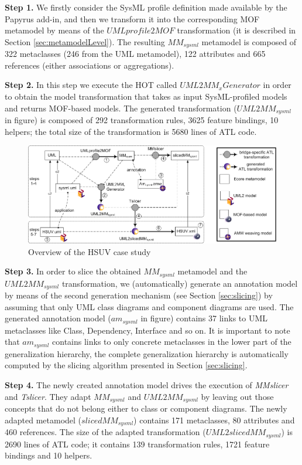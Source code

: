 \textbf{Step 1.} We firstly consider the SysML profile definition made available by the Papyrus add-in,
and then we transform it into the corresponding MOF metamodel
by means of the $UMLprofile2MOF$ transformation (it is described in Section \ref{sec:metamodelLevel}). 
The resulting $MM_{sysml}$ metamodel is composed of 322 metaclasses (246 from the UML metamodel), 
122 attributes and 665 references (either associations or aggregations).

\textbf{Step 2.} In this step we execute the HOT called $UML2MM_xGenerator$ in order to obtain the
model transformation that takes as input SysML-profiled models and returns MOF-based models. The generated transformation 
($UML2MM_{sysml}$ in figure) is composed of 292 transformation rules, 3625 feature bindings, 10 helpers; the total size of the transformation is 5680 lines of ATL code.
%
\vspace{-.4cm}
\begin{figure}[htbp]
	\centering
		\includegraphics[width=1\textwidth]{figures/caseStudy.png}
	\caption{Overview of the HSUV case study}
	\label{fig:caseStudy}
\end{figure}
\vspace{-.6cm}

\textbf{Step 3.} In order to slice the obtained $MM_{sysml}$ metamodel and the $UML2MM_{sysml}$ transformation, 
we (automatically) generate an annotation model by means of the second generation mechanism
(see Section \ref{sec:slicing}) by assuming that only UML class diagrams and component diagrams are used.
The generated annotation model ($am_{sysml}$ in figure) contains 37 links to UML metaclasses like Class, Dependency, Interface and so on.
It is important to note that $am_{sysml}$ contains links to only concrete metaclasses in the lower part of the generalization hierarchy, the complete generalization hierarchy is automatically computed by the slicing algorithm presented in Section \ref{sec:slicing}.

\textbf{Step 4.} The newly created annotation model drives the execution of \textit{MMslicer} and \textit{Tslicer}.
They adapt $MM_{sysml}$ and $UML2MM_{sysml}$ by leaving out those concepts that do not
belong either to class or component diagrams. 
The newly adapted metamodel ($slicedMM_{sysml}$) contains 171 metaclasses, 80 attributes and 460 references. 
The size of the adapted transformation ($UML2slicedMM_{sysml}$) is 2690 lines 
of ATL code; it contains 139 transformation rules, 1721 feature bindings and 10 helpers. 

